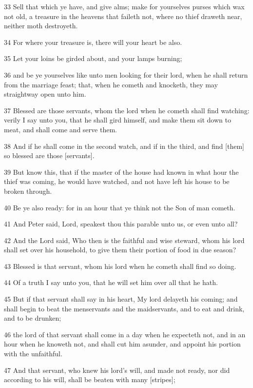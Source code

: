 \par 33 Sell that which ye have, and give alms; make for yourselves purses which wax not old, a treasure in the heavens that faileth not, where no thief draweth near, neither moth destroyeth.
\par 34 For where your treasure is, there will your heart be also.
\par 35 Let your loins be girded about, and your lamps burning;
\par 36 and be ye yourselves like unto men looking for their lord, when he shall return from the marriage feast; that, when he cometh and knocketh, they may straightway open unto him.
\par 37 Blessed are those servants, whom the lord when he cometh shall find watching: verily I say unto you, that he shall gird himself, and make them sit down to meat, and shall come and serve them.
\par 38 And if he shall come in the second watch, and if in the third, and find [them] so blessed are those [servants].
\par 39 But know this, that if the master of the house had known in what hour the thief was coming, he would have watched, and not have left his house to be broken through.
\par 40 Be ye also ready: for in an hour that ye think not the Son of man cometh.
\par 41 And Peter said, Lord, speakest thou this parable unto us, or even unto all?
\par 42 And the Lord said, Who then is the faithful and wise steward, whom his lord shall set over his household, to give them their portion of food in due season?
\par 43 Blessed is that servant, whom his lord when he cometh shall find so doing.
\par 44 Of a truth I say unto you, that he will set him over all that he hath.
\par 45 But if that servant shall say in his heart, My lord delayeth his coming; and shall begin to beat the menservants and the maidservants, and to eat and drink, and to be drunken;
\par 46 the lord of that servant shall come in a day when he expecteth not, and in an hour when he knoweth not, and shall cut him asunder, and appoint his portion with the unfaithful.
\par 47 And that servant, who knew his lord's will, and made not ready, nor did according to his will, shall be beaten with many [stripes];
